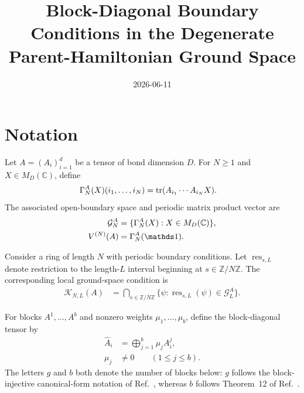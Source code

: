 \documentclass{article}
\title{Block-Diagonal Boundary Conditions in the Degenerate Parent-Hamiltonian Ground Space}
\author{}
\date{2026-06-11}
\begin{document}
\maketitle
{}

\section{Notation}

Let $A=(A_i)_{i=1}^d$ be a tensor of bond dimension $D$. For $N\geq 1$ and
$X\in M_D(\mathbb C)$, define
\begin{align}
  \Gamma_N^A(X)(i_1,\ldots,i_N)
    &=
    \operatorname{tr}(A_{i_1}\cdots A_{i_N}X).
  \label{eq:cpgsv21_block_diagonal_parent_ground_space_gamma}
\end{align}
The associated open-boundary space and periodic matrix product vector are
\begin{align}
  \mathcal G_N^A
    &=
    \{\Gamma_N^A(X):X\in M_D(\mathbb C)\},
  \label{eq:cpgsv21_block_diagonal_parent_ground_space_open_space}\\
  V^{(N)}(A)
    &=
    \Gamma_N^A(\Id).
  \label{eq:cpgsv21_block_diagonal_parent_ground_space_periodic_vector}
\end{align}

Consider a ring of length $N$ with periodic boundary conditions. Let
$\operatorname{res}_{s,L}$ denote restriction to the length-$L$ interval
beginning at $s\in\mathbb Z/N\mathbb Z$. The corresponding local ground-space
condition is
\begin{align}
  \mathcal K_{N,L}(A)
    &=
    \bigcap_{s\in\mathbb Z/N\mathbb Z}
    \{\psi:\operatorname{res}_{s,L}(\psi)\in\mathcal G_L^A\}.
  \label{eq:cpgsv21_block_diagonal_parent_ground_space_chain_space}
\end{align}

For blocks $A^1,\ldots,A^b$ and nonzero weights
$\mu_1,\ldots,\mu_b$, define the block-diagonal tensor by
\begin{align}
  \widehat A_i
    &=
    \bigoplus_{j=1}^b\mu_jA_i^j,
  \label{eq:cpgsv21_block_diagonal_parent_ground_space_weighted_tensor}\\
  \mu_j
    &\neq 0
    \qquad (1\leq j\leq b).
  \label{eq:cpgsv21_block_diagonal_parent_ground_space_nonzero_weights}
\end{align}
The letters $g$ and $b$ both denote the number of blocks below: $g$ follows
the block-injective canonical-form notation of
Ref.~\cite{Cirac2021Matrix}, whereas $b$ follows Theorem~12 of
Ref.~\cite{PerezGarcia2007MPSReps}.
\end{document}
